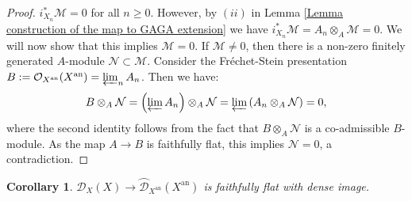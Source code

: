 \documentclass{amsart}
\newtheorem{coro}[defi]{Corollary}
\newcommand{\D}{\mathcal{D}}
\newcommand{\OX}{\mathcal{O}}
\begin{document}
\begin{proof}
$i_{X_n}^*\mathcal{M}=0$ for all $n\geq 0$. However, by $(ii)$ in Lemma \ref{Lemma construction of the map to GAGA extension} we have
$i_{X_n}^*\mathcal{M}=A_n\otimes_A\mathcal{M}=0$. We will now show that this implies $\mathcal{M}=0$. If $\mathcal{M}\neq 0$, then there is a non-zero finitely generated $A$-module $\mathcal{N}\subset \mathcal{M}$. Consider the Fréchet-Stein presentation  $B:=\OX_{X^{\operatorname{an}}}(X^{\operatorname{an}})=\varprojlim_n A_n$. Then we have:
\begin{equation*}
    B\otimes_A\mathcal{N}=\left(\varprojlim A_n\right)\otimes_A\mathcal{N}=\varprojlim \left(A_n\otimes_A\mathcal{N}\right)=0,
\end{equation*}
where the second identity follows from the fact that $B\otimes_A\mathcal{N}$ is a co-admissible $B$-module. As the map $A\rightarrow B$ is faithfully flat, this implies $\mathcal{N}=0$, a contradiction.
\end{proof}
\begin{coro}
$\D_X(X)\rightarrow \wideparen{\D}_{X^{\operatorname{an}}}(X^{\operatorname{an}})$ is faithfully flat with dense image.
\end{coro}
\end{document}
